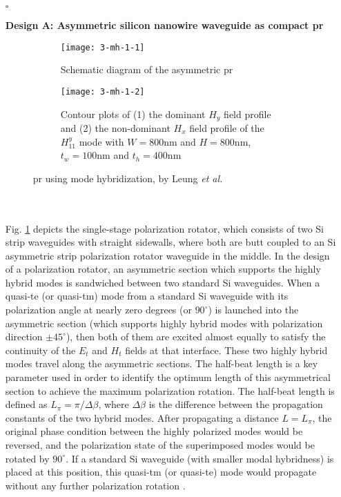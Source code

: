 \documentclass[../report.tex]{subfiles}
\begin{document}
\begin{itemize}[leftmargin=*]
	
	\item[$\square$] \begin{minipage}[t]{\textwidth}\textbf{Design A: Asymmetric silicon nanowire waveguide as compact \gls{pr}}
	\begin{figure}[H] %
		\begin{subfigure}[t]{0.45\textwidth}
			\texttt{[image: 3-mh-1-1]}
			\caption{Schematic diagram of the asymmetric \gls{pr}}
			\label{fig:3_mh_1_1}
		\end{subfigure}
		\hfill
		\begin{subfigure}[t]{0.45\textwidth}
			\texttt{[image: 3-mh-1-2]}
			\caption{Contour plots of (1) the dominant $H_y$ field profile and (2) the non-dominant $H_x$ field profile of the $H_{11}^{y}$ mode with $W=800 \si{\nano\meter}$ and $H=800 \si{\nano\meter}$, $t_w=100 \si{\nano\meter}$ and $t_h=400 \si{\nano\meter}$}
			\label{fig:3_mh_1_2}
		\end{subfigure}
		\caption{\gls{pr} using mode hybridization, by Leung \textit{et al.} \cite{leung_numerical_2011}}
	\end{figure}
	\end{minipage}\\\\
	Fig. \ref{fig:3_mh_1_1} depicts the single-stage polarization rotator, which consists of two Si strip waveguides with straight sidewalls, where both are butt coupled to an Si asymmetric strip polarization rotator waveguide in the middle. In the design of a polarization rotator, an asymmetric section which supports the highly hybrid modes is sandwiched between two standard Si waveguides. When a quasi-\gls{te} (or quasi-\gls{tm}) mode from a standard Si waveguide with its polarization angle at nearly zero degrees (or $90^{\circ}$) is launched into the asymmetric section (which supports highly hybrid modes with polarization direction $\pm 45^{\circ }$), then both of them are excited almost equally to satisfy the continuity of the $E_t$ and $H_t$ fields at that interface. These two highly hybrid modes travel along the asymmetric sections. The half-beat length is a key parameter used in order to identify the optimum length of this asymmetrical section to achieve the maximum polarization rotation. The half-beat length is defined as $L_{\pi }= \pi / \Delta \beta$, where $\Delta \beta$ is the difference between the propagation constants of the two hybrid modes. After propagating a distance $L = L_{\pi}$, the original phase condition between the highly polarized modes would be reversed, and the polarization state of the superimposed modes would be rotated by $90^{\circ}$. If a standard Si waveguide (with smaller modal hybridness) is placed at this position, this quasi-\gls{tm} (or quasi-\gls{te}) mode would propagate without any further polarization rotation \cite{leung_numerical_2011}.
	

\end{itemize}
\end{document}
